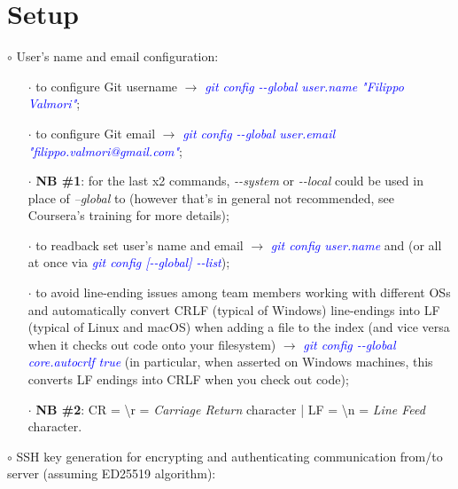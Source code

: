 \documentclass[a4paper,portrait,10pt]{article}   %
\newcommand{\mydiv}{$\rightarrow$ }   %
\newcommand{\mysapo}[1]{\textquotesingle #1\textquotesingle }   %
\newcommand{\mycmd}[1]{\textcolor{blue}{\textit{#1}}}   %
\begin{document}
\section{Setup}
$\circ$ User's name and email configuration:
\begin{itemize}
  \item[$\cdot$] to configure Git username \mydiv \mycmd{git config -{}-global user.name "Filippo Valmori"};
  \item[$\cdot$] to configure Git email \mydiv \mycmd{git config -{}-global user.email "filippo.valmori@gmail.com"};
  \item[$\cdot$] \textbf{NB \#1}: for the last x2 commands, \textit{-{}-system} or \textit{-{}-local} could be used in place of \textit{--global} to (however that's in general not recommended, see Coursera's training for more details);
  \item[$\cdot$] to readback set user's name and email \mydiv \mycmd{git config user.name} and  (or all at once via \mycmd{git config [-{}-global] -{}-list});
  \item[$\cdot$] to avoid line-ending issues among team members working with different OSs and automatically convert \mysapo{CRLF} (typical of Windows) line-endings into \mysapo{LF} (typical of Linux and macOS) when adding a file to the index (and vice versa when it checks out code onto your filesystem) \mydiv \mycmd{git config -{}-global core.autocrlf true} (in particular, when asserted on Windows machines, this converts \mysapo{LF} endings into \mysapo{CRLF} when you check out code);
  \item[$\cdot$] \textbf{NB \#2}: \mysapo{CR} = \mysapo{\textbackslash r} = \textit{Carriage Return} character | \mysapo{LF} = \mysapo{\textbackslash n} = \textit{Line Feed} character.
\end{itemize}
\vspace{5pt}
$\circ$ SSH key generation for encrypting and authenticating communication from/to server (assuming ED25519 algorithm):
\end{document}

